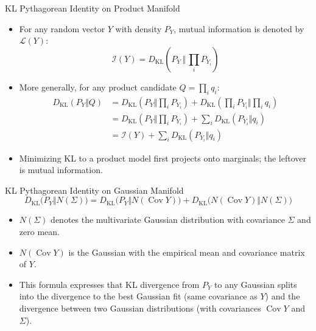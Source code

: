 \documentclass{beamer}
\begin{document}
\begin{frame}{KL Pythagorean Identity on Product Manifold}
  \begin{itemize}
    \item For any random vector \(Y\) with density \(P_Y\), mutual information is denoted by \(\mathscr{L}(Y)\):
      \[
        \mathscr{I}(Y) = D_{\mathrm{KL}}(P_Y \,\Vert \, \prod_{i} P_{Y_i})
      \]
    \item More generally, for any product candidate \(Q = \prod_{i} q_i\):
      \begin{align*}
      D_{\mathrm{KL}}\left(P_Y \Vert Q\right)
      &= D_{\mathrm{KL}}\left(P_Y \Vert \prod_{i} P_{Y_i}\right) + D_{\mathrm{KL}}\left(\prod_{i} P_{Y_i} \Vert \prod_{i} q_{i}\right) \\
      &= D_{\mathrm{KL}}\left(P_Y \Vert \prod_{i} P_{Y_i}\right) + \sum_{i} D_{\mathrm{KL}}\left(P_{Y_i} \Vert q_i\right) \\
      &= \mathscr{I}(Y) + \sum_{i} D_{\mathrm{KL}}\left(P_{Y_i} \Vert q_i\right)
    \end{align*}
    \item Minimizing KL to a product model first projects onto marginals; the leftover is mutual information.
  \end{itemize}
\end{frame}

\begin{frame}{KL Pythagorean Identity on Gaussian Manifold}
  $$
      D_{\mathrm{KL}}\big(P_Y \Vert N(\Sigma)\big) = D_{\mathrm{KL}}\big(P_Y \Vert N(\operatorname{Cov} Y)\big) + D_{\mathrm{KL}}\big(N(\operatorname{Cov} Y) \Vert N(\Sigma)\big)
    $$
  \begin{itemize}
    \item $N(\Sigma)$ denotes the multivariate Gaussian distribution with covariance $\Sigma$ and zero mean.
    \item $N(\operatorname{Cov} Y)$ is the Gaussian with the empirical mean and covariance matrix of $Y$.
    \item This formula expresses that KL divergence from $P_Y$ to any Gaussian splits into the divergence to the best Gaussian fit (same covariance as $Y$) and the divergence between two Gaussian distributions (with covariances $\operatorname{Cov} Y$ and $\Sigma$).
  \end{itemize}
\end{frame}
\end{document}
